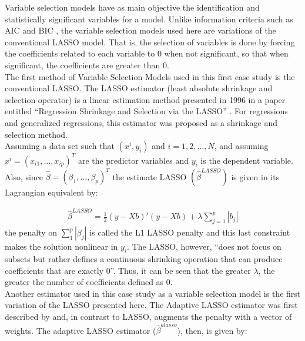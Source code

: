 Variable selection models have as main objective the identification and statistically significant variables for a model. Unlike information criteria such as AIC \cite[]{akaike1974new} and BIC \cite[]{schwarz1978estimating}, the variable selection models used here are variations of the conventional LASSO model. That is, the selection of variables is done by forcing the coefficients related to each variable to 0 when not significant, so that when significant, the coefficients are greater than 0.\\

The first method of Variable Selection Models used in this first case study is the conventional LASSO. The LASSO estimator (least absolute shrinkage and selection operator) is a linear estimation method presented in 1996 in a paper entitled ``Regression Shrinkage and Selection via the LASSO'' \cite[]{tibshirani1996regression}. For regressions and generalized regressions, this estimator was proposed as a shrinkage and selection method.\\

Assuming a data set such that $(x^i, y_i)$ and $i = 1, 2, \dots , N$, and assuming $x^i = (x_{i1}, \dots, x_{ip})^T$ are the predictor variables and $y_i$ is the dependent variable. Also, since $\hat{\beta} = (\beta_1, \dots, \beta_p)^T$ the estimate LASSO $(\hat{\beta}^{LASSO})$ \cite[p. 268]{tibshirani1996regression} is given in its Lagrangian equivalent by:

\begin{align} \label{eq:LASSO}
    \hat{\beta}^{LASSO} = \frac{1}{2}(y - Xb)'(y - Xb) + \lambda\sum_{j=1}^p|b_j|
\end{align}
the penalty on $\sum_1 ^p |\beta_j|$ is called the L1 LASSO penalty \cite[p.68]{hastie2009elements} and this last constraint makes the solution nonlinear in $y_i$. The LASSO, however, ``does not focus on subsets but rather defines a continuous shrinking operation that can produce coefficients that are exactly 0''\cite[p.286]{tibshirani1996regression}. Thus, it can be seen that the greater $\lambda$, the greater the number of coefficients defined as 0.\\

Another estimator used in this case study as a variable selection model is the first variation of the LASSO presented here. The  Adaptive LASSO estimator was first described by \cite{zou2006adaptive} and, in contrast to LASSO, augments the penalty with a vector of weights. The adaptive LASSO estimator ($\hat{\beta}^{alasso}$), then, is given by:

